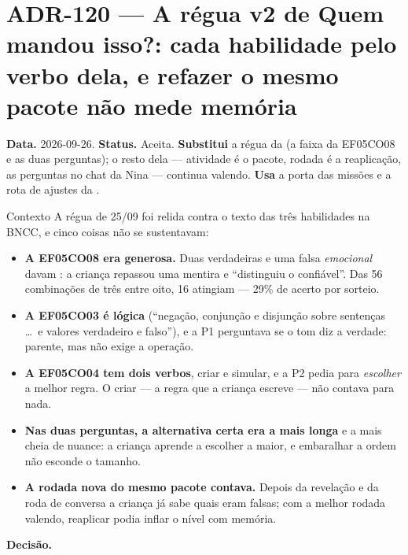 \section{ADR-120 --- A régua v2 de Quem mandou isso?: cada habilidade pelo verbo dela, e refazer o mesmo pacote não mede memória}
\label{adr:regua-v2-quem-mandou}

\textbf{Data.} 2026-09-26. \textbf{Status.} Aceita. \textbf{Substitui} a régua
da  (a faixa da EF05CO08 e as duas perguntas); o resto dela ---
atividade é o pacote, rodada é a reaplicação, as perguntas no chat da Nina ---
continua valendo. \textbf{Usa} a porta das missões e a rota de ajustes da
.

\begin{especificacao}{Contexto}
A régua de 25/09 foi relida contra o texto das três habilidades na BNCC, e
cinco coisas não se sustentavam:
\begin{itemize}
  \item \textbf{A EF05CO08 era generosa.} Duas verdadeiras e uma falsa
    \emph{emocional} davam : a criança repassou uma mentira e
    \enquote{distinguiu o confiável}. Das 56 combinações de três entre oito,
    16 atingiam --- 29\% de acerto por sorteio.
  \item \textbf{A EF05CO03 é lógica} (\enquote{negação, conjunção e disjunção
    sobre sentenças \ldots\ e valores verdadeiro e falso}), e a P1 perguntava
    se o tom diz a verdade: parente, mas não exige a operação.
  \item \textbf{A EF05CO04 tem dois verbos}, criar e simular, e a P2 pedia
    para \emph{escolher} a melhor regra. O criar --- a regra que a criança
    escreve --- não contava para nada.
  \item \textbf{Nas duas perguntas, a alternativa certa era a mais longa} e a
    mais cheia de nuance: a criança aprende a escolher a maior, e embaralhar a
    ordem não esconde o tamanho.
  \item \textbf{A rodada nova do mesmo pacote contava.} Depois da revelação e
    da roda de conversa a criança já sabe quais eram falsas; com a melhor
    rodada valendo, reaplicar podia inflar o nível com memória.
\end{itemize}
\end{especificacao}

\textbf{Decisão.}

